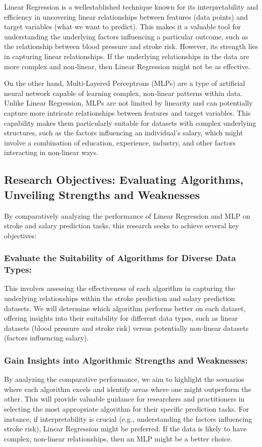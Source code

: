 \documentclass[runningheads]{paper}
\begin{document}
Linear Regression is a well\-established technique known for its interpretability
and efficiency in uncovering linear relationships between features (data points) 
and target variables (what we want to predict). This makes it a valuable tool 
for understanding the underlying factors influencing a particular outcome, such 
as the relationship between blood pressure and stroke risk. However, its strength 
lies in capturing linear relationships. If the underlying relationships in the 
data are more complex and non-linear, then Linear Regression might not be as 
effective.

On the other hand, Multi-Layered Perceptrons (MLPs) are a type of artificial 
neural network capable of learning complex, non-linear patterns within data. 
Unlike Linear Regression, MLPs are not limited by linearity and can potentially 
capture more intricate relationships between features and target variables. This 
capability makes them particularly suitable for datasets with complex underlying 
structures, such as the factors influencing an individual's salary, which might 
involve a combination of education, experience, industry, and other factors 
interacting in non-linear ways.

\subsection{Research Objectives: Evaluating Algorithms, Unveiling Strengths and Weaknesses}
By comparatively analyzing the performance of Linear Regression and MLP on 
stroke and salary prediction tasks, this research seeks to achieve several key 
objectives:

\subsubsection{Evaluate the Suitability of Algorithms for Diverse Data Types:}
This involves assessing the effectiveness of each algorithm in capturing the 
underlying relationships within the stroke prediction and salary prediction 
datasets. We will determine which algorithm performs better on each dataset, 
offering insights into their suitability for different data types, such as 
linear datasets (blood pressure and stroke risk) versus potentially non-linear 
datasets (factors influencing salary).

\subsubsection{Gain Insights into Algorithmic Strengths and Weaknesses:}
By analyzing the comparative performance, we aim to highlight the scenarios where
each algorithm excels and identify areas where one might outperform the other. 
This will provide valuable guidance for researchers and practitioners in 
selecting the most appropriate algorithm for their specific prediction tasks. 
For instance, if interpretability is crucial (e.g., understanding the factors 
influencing stroke risk), Linear Regression might be preferred. If the data is 
likely to have complex, non-linear relationships, then an MLP might be a better 
choice.
\end{document}
